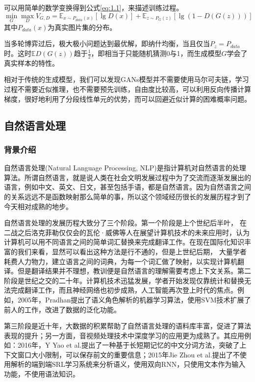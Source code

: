 可以用简单的数学变换得到公式\eqref{eq:1.1}，来描述训练过程。
\begin{equation}
    \label{eq:1.1}
    \min_{G}\max_{D} V_{G,D} = \mathbb{E}_{x \sim P_{data}(x)}[\lg D(x)] + \mathbb{E}_{z \sim P_{G}(z)}[\lg (1-D(G(z)))]
\end{equation}
其中$P_{data}(x)$为真实图片集的分布。

当多轮博弈过后，极大极小问题达到最优解，即纳什均衡，当且仅当$P_z = P_{data}$时。这时$\mathbb{E} D(G(z))$趋于$\frac{1}{2}$，即相当于只能随机猜测0与1，而生成模型$G$学会了真实样本的特性。

相对于传统的生成模型，我们可以发现GANs模型并不需要使用马尔可夫链，学习过程不需要近似推理，也不需要预先训练，自由度比较高，可以利用反向传播计算梯度，很好地利用了分段线性单元的优势，而可以回避近似计算的困难概率问题。

\subsection{自然语言处理}
\subsubsection{背景介绍}
自然语言处理(Natural Language Processing, NLP)是指计算机对自然语言的处理算法。所谓自然语言，就是说人类在社会文明发展过程中为了交流而逐渐发展出的语言，例如中文、英文、日文，甚至包括手语，都是自然语言。因为自然语言之间的关系远远不是函数映射那么简单的事，所以这个领域经历很长的发展历程才到了今天相对成熟的地步。

自然语言处理的发展历程大致分了三个阶段。第一个阶段是上个世纪后半叶，
在二战之后洛克菲勒仅仅会的瓦伦·威佛等人在展望计算机技术的未来应用时，认为计算机可以用不同语言之间的简单词汇替换来完成翻译工作。在现在国际化知识丰富的我们来看，显然可以看出这种方法是行不通的，但是上世纪后期，
大量学者耗费人力物力，建立语言之间的词典，为每一个词汇做了映射，以实现计算机翻译。但是翻译结果并不理想，教训便是自然语言的理解需要考虑上下文关系。第二阶段是世纪之交的二十年。计算机技术迅猛发展，学者开始发现仅靠统计和替换无法完成翻译工作，而且神经网络也初步成熟，人工智能再次登上时代的焦点。例如，2005年，Pradhan提出了语义角色解析的机器学习算法，使用SVM技术扩展了前人的工作，改进了数据的泛化功能。

第三阶段是近十年，大数据的积累帮助了自然语言处理的语料库丰富，促进了算法表现的提升；另一方面，音视频处理技术中深度学习的应用更为成熟了。其应用例如：2016年，Y Yao et al.提出了一种基于长短期记忆的中文分词方法，突破了上下文窗口大小限制，可以保存前文的重要信息；2015年Jie Zhou et al.提出了不使用解析的端到端SRL学习系统来分析语义，使用双向RNN，只使用文本作为输入功能，不使用语法知识。

